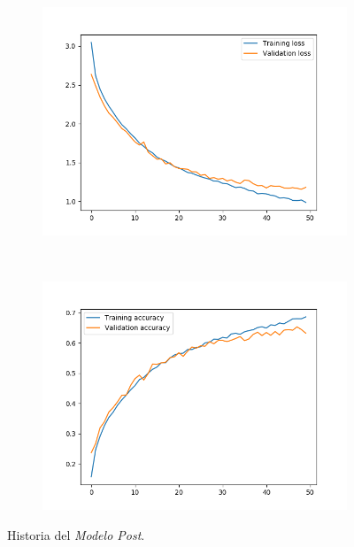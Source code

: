 \documentclass[11pt,a4paper]{article}
\begin{document}
\begin{figure}[H]
  \centering
  \begin{subfigure}{.5\textwidth}
    \centering
    \includegraphics[scale=0.4]{img/batch-post-loss.png}
    \label{fig:batch-post-loss}
  \end{subfigure}%
  ~ \quad
  \begin{subfigure}{.5\textwidth}
    \centering
    \includegraphics[scale=0.4]{img/batch-post-acc.png}
    \label{fig:batch-post-acc}
  \end{subfigure}
  \caption{Historia del \textit{Modelo Post}.}
  \label{fig:history-batch-post}
\end{figure}
\end{document}

